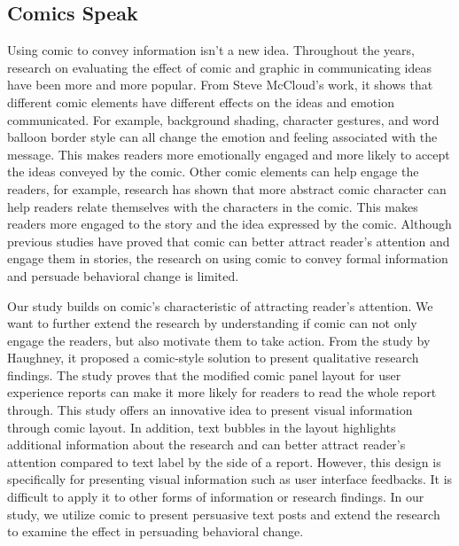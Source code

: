 \subsection{Comics Speak}
Using comic to convey information isn't a new idea. Throughout the years, research on evaluating the effect of comic and graphic in communicating ideas have been more and more popular. From Steve McCloud's work, it shows that different comic elements have different effects on the ideas and emotion communicated. For example, background shading, character gestures, and word balloon border style can all change the emotion and feeling associated with the message. This makes readers more emotionally engaged and more likely to accept the ideas conveyed by the comic. Other comic elements can help engage the readers, for example, research has shown that more abstract comic character can help readers relate themselves with the characters in the comic. This makes readers more engaged to the story and the idea expressed by the comic. Although previous studies have proved that comic can better attract reader's attention and engage them in stories, the research on using comic to convey formal information and persuade behavioral change is limited.\par
Our study builds on comic's characteristic of attracting reader's attention. We want to further extend the research by understanding if comic can not only engage the readers, but also motivate them to take action. From the study by Haughney, it proposed a comic-style solution to present qualitative research findings. The study proves that the modified comic panel layout for user experience reports can make it more likely for readers to read the whole report through. This study offers an innovative idea to present visual information through comic layout. In addition, text bubbles in the layout highlights additional information about the research and can better attract reader's attention compared to text label by the side of a report. However, this design is specifically for presenting visual information such as user interface feedbacks. It is difficult to apply it to other forms of information or research findings. In our study, we utilize comic to present persuasive text posts and extend the research to examine the effect in persuading behavioral change.\par
